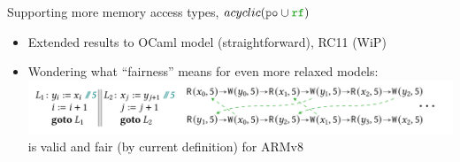 \begin{frame}{Supporting more memory access types, \sout{$acyclic(\lPO \cup \lRF)$}}


      
            
    


  \pause
  \begin{itemize}
  \item Extended results to OCaml model (straightforward), RC11 (WiP)
    \pause
  \item Wondering what ``fairness'' means for even more relaxed models:
    \pause
    \includegraphics[width=1.0\linewidth]{arm_unfair.png}
    \pause
    is valid and fair (by current definition) for ARMv8


\end{itemize}
\end{frame}
